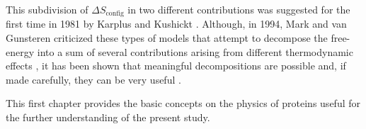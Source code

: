 This subdivision of $\Delta S_\text{config}$ in two different contributions was suggested for the first time in 1981 by Karplus and Kushickt \cite{karplus1981method}. Although, in 1994, Mark and van Gunsteren criticized these types of models that attempt to decompose the free-energy into a sum of several contributions arising from different thermodynamic effects \cite{mark1994decomposition}, it has been shown that meaningful decompositions are possible and, if made carefully, they can be very useful \cite{lazaridis2002thermodynamics}.

This first chapter provides the basic concepts on the physics of proteins useful for the further understanding of the present study.




